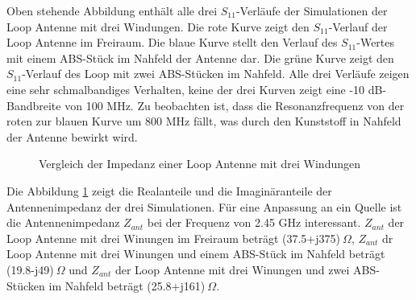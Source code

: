Oben stehende Abbildung enthält alle drei $S_{11}$-Verläufe der Simulationen der Loop Antenne mit drei Windungen. Die rote Kurve zeigt den $S_{11}$-Verlauf der Loop Antenne im Freiraum. Die blaue Kurve stellt den Verlauf des $S_{11}$-Wertes mit einem ABS-Stück im Nahfeld der Antenne dar. Die grüne Kurve zeigt den $S_{11}$-Verlauf des Loop mit zwei ABS-Stücken im Nahfeld. Alle drei Verläufe zeigen eine sehr schmalbandiges Verhalten, keine der drei Kurven zeigt eine -10 dB-Bandbreite von 100 MHz. Zu beobachten ist, dass die Resonanzfrequenz von der roten zur blauen Kurve um 800 MHz fällt, was durch den Kunststoff in Nahfeld der Antenne bewirkt wird.

\newpage
\begin{figure}[!ht]
	\centering
	\begingroup
	
	\endgroup
	\caption{Vergleich der Impedanz einer Loop Antenne mit drei Windungen}
	\label{Impedanz_Loop_3N_Vergleich_Simulation}
\end{figure}

Die Abbildung \ref{Impedanz_Loop_3N_Vergleich_Simulation} zeigt die Realanteile und die Imaginäranteile der Antennenimpedanz der drei Simulationen. Für eine Anpassung an ein Quelle ist die Antennenimpedanz $Z_{ant}$ bei der Frequenz von 2.45 GHz interessant. $Z_{ant}$ der Loop Antenne mit drei Winungen im Freiraum beträgt (37.5+j375)$\ \Omega$, $Z_{ant}$ dr Loop Antenne mit drei Winungen und  einem ABS-Stück im Nahfeld beträgt (19.8-j49)$\ \Omega$ und
$Z_{ant}$ der Loop Antenne mit drei Winungen und zwei ABS-Stücken im Nahfeld beträgt (25.8+j161)$\ \Omega$.



